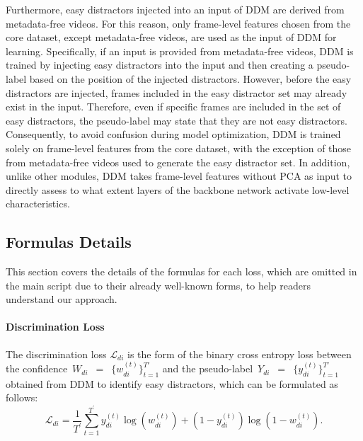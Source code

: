 \documentclass[10pt,twocolumn,letterpaper]{article}
\begin{document}
        Furthermore, easy distractors injected into an input of DDM are derived from metadata-free videos. For this reason, only frame-level features chosen from the core dataset, except metadata-free videos, are used as the input of DDM for learning. Specifically, if an input is provided from metadata-free videos, DDM is trained by injecting easy distractors into the input and then creating a pseudo-label based on the position of the injected distractors. However, before the easy distractors are injected, frames included in the easy distractor set may already exist in the input. Therefore, even if specific frames are included in the set of easy distractors, the pseudo-label may state that they are not easy distractors. Consequently, to avoid confusion during model optimization, DDM is trained solely on frame-level features from the core dataset, with the exception of those from metadata-free videos used to generate the easy distractor set. In addition, unlike other modules, DDM takes frame-level features without PCA as input to directly assess to what extent layers of the backbone network activate low-level characteristics.
        
        
    \subsection{Formulas Details}\label{formula}
        This section covers the details of the formulas for each loss, which are omitted in the main script due to their already well-known forms, to help readers understand our approach.
        \paragraph{Discrimination Loss \\}
        The discrimination loss $\mathcal{L}_{di}$ is the form of the binary cross entropy loss between the confidence~$W_{di}$~$=$~$\{ w^{(t)}_{di} \}^{T'}_{t=1}$ and the pseudo-label~$Y_{di}$~$=$~$\{ y^{(t)}_{di}\}^{T'}_{t=1}$ obtained from DDM to identify easy distractors, which can be formulated as follows:
        \begin{equation}
            \mathcal{L}_{di}=\frac{1}{T^{\prime }} \sum^{T^{\prime }}_{t=1} y^{(t)}_{di}\log(w^{(t)}_{di})+(1-y^{(t)}_{di})\log( 1-w^{(t)}_{di}).
        \end{equation}
\end{document}
